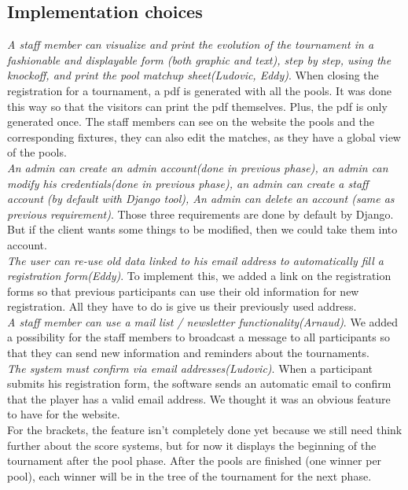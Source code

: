 \documentclass[a4paper, 12pt]{article}
\begin{document}
\subsection*{Implementation choices}
\textit{A staff member can visualize and print the evolution of the tournament in a fashionable and displayable form (both graphic and text), step by step, using the knockoff, and print the pool matchup sheet(Ludovic, Eddy)}. When closing the registration for a tournament, a pdf is generated with all the pools. It was done this way so that the visitors can print the pdf themselves. Plus, the pdf is only generated once. The staff members can see on the website the pools and the corresponding fixtures, they can also edit the matches, as they have a global view of the pools. \\

\textit{An admin can create an admin account(done in previous phase), an admin can modify his credentials(done in previous phase), an admin can create a staff account (by default with Django tool), An admin can delete an account (same as previous requirement)}. Those three requirements are done by default by Django. But if the client wants some things to be modified, then we could take them into account. \\

\textit{The user can re-use old data linked to his email address to automatically fill a registration form(Eddy)}. To implement this, we added a link on the registration forms so that previous participants can use their old information for new registration. All they have to do is give us their previously used address.\\

\textit{A staff member can use a mail list / newsletter functionality(Arnaud)}. We added a possibility for the staff members to  broadcast a message to all participants so that they can send new information and reminders about the tournaments.\\

\textit{The system must confirm via email addresses(Ludovic)}. When a participant submits his registration form, the software sends an automatic email to confirm that the player has a valid email address. We thought it was an obvious feature to have for the website. \\

For the brackets, the feature isn't completely done yet because we still need think further about the score systems, but for now it displays the beginning of the tournament after the pool phase. After the pools are finished (one winner per pool), each winner will be in the tree of the tournament for the next phase. \\
\end{document}
